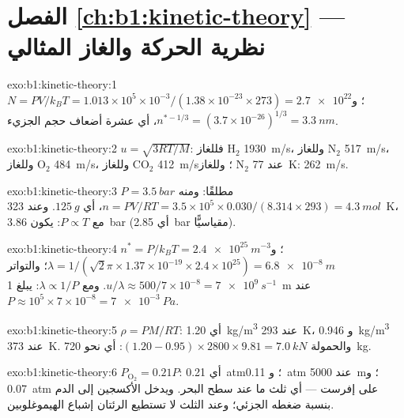 \section*{الفصل \ref{ch:b1:kinetic-theory} --- نظرية الحركة والغاز المثالي}

\begin{solution}{exo:b1:kinetic-theory:1}
$N = PV/k_BT = 1.013\times10^5 \times 10^{-3}/(1.38\times10^{-23} \times 273) =
\num{2.7e22}$؛ و $n^{*-1/3} = (3.7\times10^{-26})^{1/3} = \qty{3.3}{nm}$، أي عشرة
أضعاف حجم الجزيء.
\end{solution}

\begin{solution}{exo:b1:kinetic-theory:2}
$u = \sqrt{3RT/M}$: فللغاز H$_2$ \qty{1930}{m/s}، وللغاز N$_2$ \qty{517}{m/s}، وللغاز O$_2$
\qty{484}{m/s}، وللغاز CO$_2$ \qty{412}{m/s}؛ وللغاز N$_2$ عند \qty{77}{K}: \qty{262}{m/s}.
\end{solution}

\begin{solution}{exo:b1:kinetic-theory:3}
$P = \qty{3.5}{bar}$ مطلقًا: ومنه $n = PV/RT = 3.5\times10^5 \times 0.030/(8.314
\times 293) = \qty{4.3}{mol}$، أي $\qty{125}{g}$. وعند \qty{323}{K}، مع $P \propto T$:
يكون \qty{3.86}{bar} (أي \qty{2.85}{bar} مقياسيًّا).
\end{solution}

\begin{solution}{exo:b1:kinetic-theory:4}
$n^* = P/k_BT = \qty{2.4e25}{m^{-3}}$؛ و $\lambda = 1/(\sqrt2\pi \times 1.37\times
10^{-19} \times 2.4\times10^{25}) = \qty{6.8e-8}{m}$؛ والتواتر $u/\lambda \approx
500/7\times10^{-8} = \qty{7e9}{s^{-1}}$. ومع $\lambda \propto 1/P$: يبلغ \qty{1}{m} عند
$P \approx 10^5 \times 7\times10^{-8} = \qty{7e-3}{Pa}$.
\end{solution}

\begin{solution}{exo:b1:kinetic-theory:5}
$\rho = PM/RT$: أي \qty{1.20}{kg/m^3} عند \qty{293}{K}، و \qty{0.946}{kg/m^3} عند
\qty{373}{K}. والحمولة $(1.20 - 0.95) \times 2800 \times 9.81 = \qty{7.0}{kN}$:
أي نحو \qty{720}{kg}.
\end{solution}

\begin{solution}{exo:b1:kinetic-theory:6}
$P_{\mathrm{O}_2} = 0.21P$: أي \qty{0.21}{atm}؛ و \qty{0.11}{atm} عند \qty{5000}{m}؛
و \qty{0.07}{atm} على إفرست --- أي ثلث ما عند سطح البحر. ويدخل الأكسجين إلى
الدم بنسبة ضغطه الجزئي؛ وعند الثلث لا تستطيع الرئتان
إشباع الهيموغلوبين.
\end{solution}


